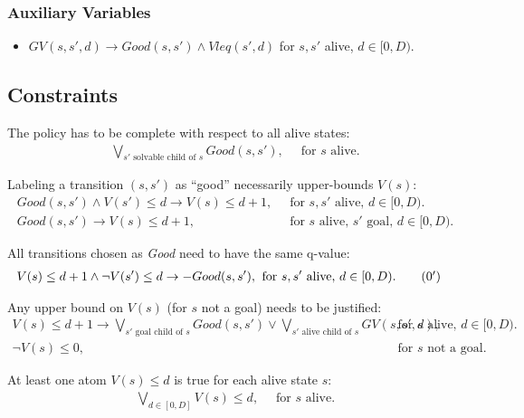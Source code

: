 \documentclass[a4paper]{article}
\begin{document}
\subsubsection{Auxiliary Variables}
\begin{itemize}
 \item $GV(s, s', d) \rightarrow Good(s, s') \land Vleq(s', d)$ for $s, s'$ alive, $d \in [0, D)$.
\end{itemize}

\subsection{Constraints}

\noindent The policy has to be complete with respect to all alive states:
\begin{align}
\bigvee_{s' \text{ solvable child of } s} Good(s, s'),&\;\; \text{for $s$ alive.}
\end{align}


\noindent Labeling a transition $(s, s')$ as ``good'' necessarily upper-bounds $V(s)$:
\begin{align}
 Good(s, s') \land V(s') \leq d \rightarrow V(s) \leq d+1,&\;\; \text{for $s, s'$ alive, $d \in [0, D)$.} \\
 Good(s, s') \rightarrow V(s) \leq d+1,&\;\; \text{for $s$ alive, $s'$ goal, $d \in [0, D)$.}
\end{align}

\noindent All transitions chosen as \emph{Good} need to have the same q-value:
\begin{align}
 V(s) \leq d+1 \land \neg V(s') \leq d \rightarrow -Good(s, s'),&\;\; \text{for $s, s'$ alive, $d \in [0, D)$.} \tag{\theequation${}^\prime$}
\end{align}


\noindent Any upper bound on $V(s)$ (for $s$ not a goal) needs to be justified:
\begin{align}
 V(s) \leq d+1 \rightarrow \bigvee_{s' \text{ goal child of } s} Good(s, s') \lor
                           \bigvee_{s' \text{ alive child of } s} GV(s, s', d),&
                           \;\; \text{for $s$ alive, $d \in [0, D)$.} \\
 \neg V(s) \leq 0,&\;\; \text{for $s$ not a goal.}
\end{align}

\noindent At least one atom $V(s) \leq d$ is true for each alive state $s$:
\begin{align}
 \bigvee_{d \in [0, D]} V(s) \leq d,&\;\; \text{for $s$ alive.}
\end{align}
\end{document}
